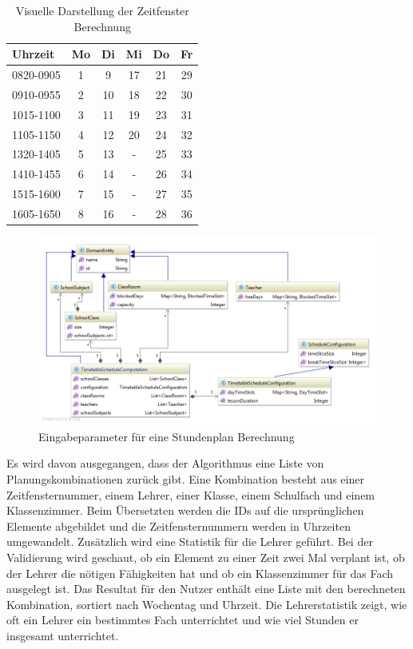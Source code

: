 \begin{table}[ht]
\centering
  \begin{tabular}{ l | c | c | c | c | c }
	\hline
	\rowcolor{gray}
	\textbf{Uhrzeit} 	& \textbf{Mo}	& \textbf{Di} 	& \textbf{Mi}	&  \textbf{Do}	&  \textbf{Fr}\\ \hline
	0820-0905		& 1			& 9			& 17			& 21			& 29		\\ \hline
	0910-0955		& 2			& 10			& 18			& 22			& 30		\\ \hline
	1015-1100		& 3			& 11			& 19			& 23			& 31		\\ \hline
	1105-1150		& 4			& 12			& 20			& 24			& 32		\\ \hline \hline
	1320-1405		& 5			& 13			& -			& 25			& 33		\\ \hline
	1410-1455		& 6			& 14			& -			& 26			& 34		\\ \hline
	1515-1600		& 7			& 15			& -			& 27			& 35		\\ \hline
	1605-1650		& 8			& 16			& -			& 28			& 36		\\ \hline
  \end{tabular}
   \caption{Visuelle Darstellung der Zeitfenster Berechnung}\label{table:timeslice_calc}
\end{table}

\begin{figure}[h]
\centering
\includegraphics[scale=0.5]{images/probleme/timetableSchedule.png}
\caption[Eingabeparameter für eine Stundenplan Berechnung]{Eingabeparameter für eine Stundenplan Berechnung \selfmade{}}
\label{fig:timetableSchedule_input}
\end{figure}

\FloatBarrier

Es wird davon ausgegangen, dass der Algorithmus eine Liste von Planungskombinationen zurück gibt. Eine Kombination besteht aus einer Zeitfensternummer, einem Lehrer, einer Klasse, 
einem Schulfach und einem Klassenzimmer. Beim Übersetzten werden die IDs auf die ursprünglichen Elemente abgebildet und die Zeitfensternummern werden in Uhrzeiten umgewandelt. 
Zusätzlich wird eine Statistik für die Lehrer geführt. Bei der Validierung wird geschaut, ob ein Element zu einer Zeit zwei Mal verplant ist, ob der Lehrer die nötigen Fähigkeiten hat und ob ein 
Klassenzimmer für das Fach ausgelegt ist. Das Resultat für den Nutzer enthält eine Liste mit den berechneten Kombination, sortiert nach Wochentag und Uhrzeit. Die Lehrerstatistik zeigt, wie 
oft ein Lehrer ein bestimmtes Fach unterrichtet und wie viel Stunden er insgesamt unterrichtet.

